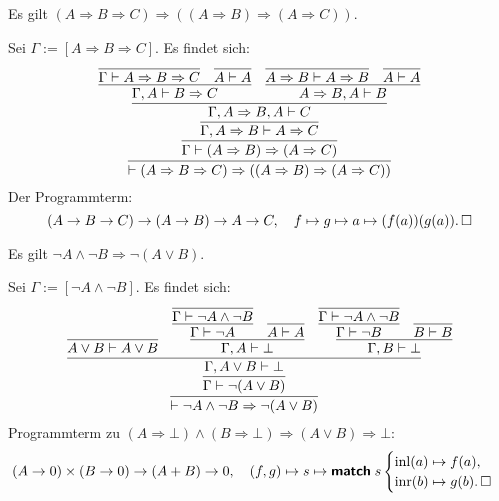 \begin{Satz}
Es gilt $(A\Rightarrow B\Rightarrow C)\Rightarrow ((A\Rightarrow B)\Rightarrow (A\Rightarrow C))$.
\end{Satz}

\begin{Beweis}
Sei $\Gamma:=[A\Rightarrow B\Rightarrow C]$. Es findet sich:
\[\infer{\vdash (A\Rightarrow B\Rightarrow C)\Rightarrow ((A\Rightarrow B)\Rightarrow (A\Rightarrow C))}{
  \infer{\Gamma\vdash (A\Rightarrow B)\Rightarrow (A\Rightarrow C)}{
    \infer{\Gamma, A\Rightarrow B\vdash A\Rightarrow C}{
      \infer{\Gamma, A\Rightarrow B, A\vdash C}{
        \infer{\Gamma, A\vdash B\Rightarrow C}{
          \infer{\Gamma\vdash A\Rightarrow B\Rightarrow C}{} & \infer{A\vdash A}{}}
    & \infer{A\Rightarrow B, A\vdash B}{
        \infer{A\Rightarrow B\vdash A\Rightarrow B}{} & \infer{A\vdash A}{}}}}}}
\]
Der Programmterm:
\[(A\to B\to C)\to (A\to B)\to A\to C,\quad
f\mapsto g\mapsto a\mapsto (f(a))(g(a)).\,\square\]
\end{Beweis}
\newpage

\begin{Satz}
Es gilt $\neg A\land\neg B\Rightarrow\neg (A\lor B)$.
\end{Satz}
\begin{Beweis}
Sei $\Gamma:=[\neg A\land\neg B]$. Es findet sich:
\[
\infer{\vdash \neg A\land\neg B\Rightarrow\neg (A\lor B)}{
  \infer{\Gamma\vdash\neg (A\lor B)}{
    \infer{\Gamma, A\lor B\vdash\bot}{
      \infer{A\lor B\vdash A\lor B}{}
    & \infer{\Gamma,A\vdash\bot}{
        \infer{\Gamma\vdash\neg A}{\infer{\Gamma\vdash\neg A\land\neg B}{}}
      & \infer{A\vdash A}{}}
    & \infer{\Gamma,B\vdash\bot}{
        \infer{\Gamma\vdash\neg B}{\infer{\Gamma\vdash\neg A\land\neg B}{}}
      & \infer{B\vdash B}{}}}}}
\]
Programmterm zu $(A\Rightarrow\bot)\land (B\Rightarrow\bot)\Rightarrow (A\lor B)\Rightarrow\bot$:
\[(A\to 0)\times (B\to 0)\to (A+B)\to 0,\quad (f, g)\mapsto s\mapsto\text{{\normalfont\sffamily\bfseries match}}\; s
\begin{cases}
\operatorname{inl}(a)\mapsto f(a),\\
\operatorname{inr}(b)\mapsto g(b).\,\square
\end{cases}\]
\end{Beweis}

